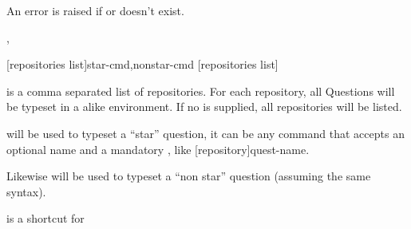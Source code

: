 \documentclass[10pt]{article}
\begin{document}
\begin{tsremark}
An error is raised if  or  doesn't exist.
\end{tsremark}

%

\begin{codedescribe}[code,new=2025/10/03]{\QuestionsFmtList,\QuestionsList}\label{quest list}
\begin{codesyntax}%
\tsmacro{\QuestionsFmtList}[repositories list]{star-cmd,nonstar-cmd}
\tsmacro{\QuestionsList}[repositories list]{}
\end{codesyntax}
 is a comma separated list of repositories. For each repository,  all Questions will be typeset in a  alike environment. If no  is supplied, all repositories will be listed.

 will be used to typeset a ``star'' question, it can be any command that accepts an optional  name and a mandatory , like \tsmacro{\starcmd}[repository]{quest-name}.

Likewise  will be used to typeset a ``non star'' question (assuming the same syntax).

 is a shortcut for


\end{codedescribe}
\end{document}
